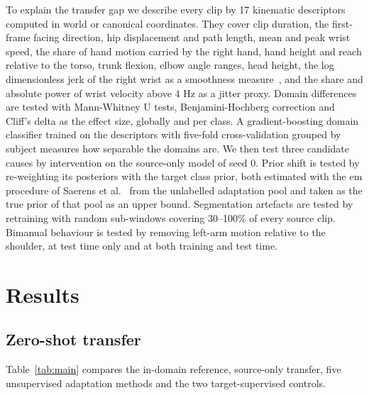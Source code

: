 \documentclass[Afour,sagev,times]{sagej}
\begin{document}
To explain the transfer gap we describe every clip by 17 kinematic descriptors
computed in world or canonical coordinates. They cover clip duration, the
first-frame facing direction, hip displacement and path length, mean and peak
wrist speed, the share of hand motion carried by the right hand, hand height
and reach relative to the torso, trunk flexion, elbow angle ranges, head
height, the log dimensionless jerk of the right wrist as a smoothness
measure~\cite{balasubramanian2015smoothness}, and the share and absolute power
of wrist velocity above 4 Hz as a jitter proxy. Domain differences are tested
with Mann-Whitney U tests, Benjamini-Hochberg correction and Cliff's delta as
the effect size, globally and per class. A gradient-boosting domain classifier
trained on the descriptors with five-fold cross-validation grouped by subject
measures how separable the domains are. We then test three candidate causes by
intervention on the source-only model of seed 0. Prior shift is tested by
re-weighting its posteriors with the target class prior, both estimated with
the \ac{em} procedure of Saerens et al.~\cite{saerens2002priors} from the
unlabelled adaptation pool and taken as the true prior of that pool as an upper
bound. Segmentation artefacts are tested by retraining with random sub-windows
covering 30--100\% of every source clip. Bimanual behaviour is tested by
removing left-arm motion relative to the shoulder, at test time only and at
both training and test time.

\section{Results}
\label{sec:results}

\subsection{Zero-shot transfer}

Table~\ref{tab:main} compares the in-domain reference, source-only transfer,
five unsupervised adaptation methods and the two target-supervised controls.
\end{document}

